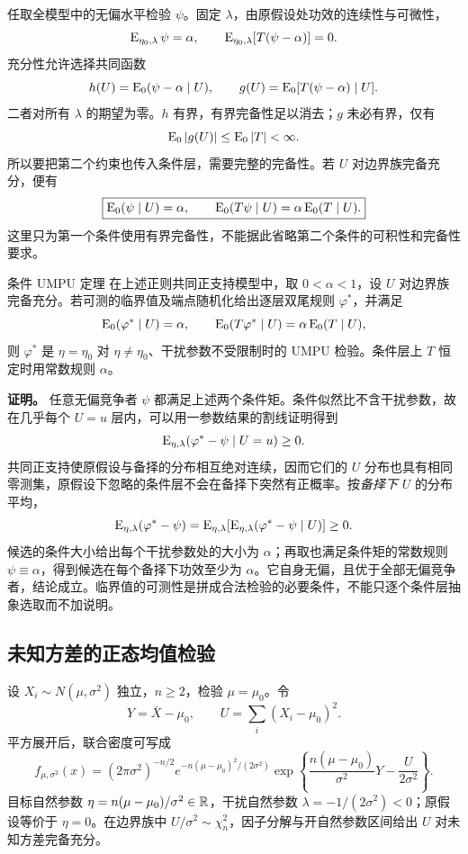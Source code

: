 任取全模型中的无偏水平检验 $\psi$。固定 $\lambda$，由原假设处功效的连续性与可微性，
\[
 \operatorname{E}_{\eta_0,\lambda}\psi=\alpha,\qquad
 \operatorname{E}_{\eta_0,\lambda}[T(\psi-\alpha)]=0.
\]
充分性允许选择共同函数
\[
 h(U)=\operatorname{E}_0(\psi-\alpha\mid U),\qquad
 g(U)=\operatorname{E}_0[T(\psi-\alpha)\mid U].
\]
二者对所有 $\lambda$ 的期望为零。$h$ 有界，有界完备性足以消去；$g$ 未必有界，仅有
\[
 \operatorname{E}_0|g(U)|\le\operatorname{E}_0|T|<\infty.
\]
所以要把第二个约束也传入条件层，需要完整的完备性。若 $U$ 对边界族完备充分，便有
\[
 \boxed{\operatorname{E}_0(\psi\mid U)=\alpha,\qquad
 \operatorname{E}_0(T\psi\mid U)=\alpha\operatorname{E}_0(T\mid U).}
\]
这里只为第一个条件使用有界完备性，不能据此省略第二个条件的可积性和完备性要求。

\begin{definitionbox}{条件 UMPU 定理}
在上述正则共同正支持模型中，取 $0<\alpha<1$，设 $U$ 对边界族完备充分。若可测的临界值及端点随机化给出逐层双尾规则 $\varphi^*$，并满足
\[
 \operatorname{E}_0(\varphi^*\mid U)=\alpha,\qquad
 \operatorname{E}_0(T\varphi^*\mid U)=\alpha\operatorname{E}_0(T\mid U),
\]
则 $\varphi^*$ 是 $\eta=\eta_0$ 对 $\eta\ne\eta_0$、干扰参数不受限制时的 UMPU 检验。条件层上 $T$ 恒定时用常数规则 $\alpha$。
\end{definitionbox}

\textbf{证明。}
任意无偏竞争者 $\psi$ 都满足上述两个条件矩。条件似然比不含干扰参数，故在几乎每个 $U=u$ 层内，可以用一参数结果的割线证明得到
\[
 \operatorname{E}_{\eta,\lambda}(\varphi^*-\psi\mid U=u)\ge0.
\]
共同正支持使原假设与备择的分布相互绝对连续，因而它们的 $U$ 分布也具有相同零测集，原假设下忽略的条件层不会在备择下突然有正概率。按\emph{备择下} $U$ 的分布平均，
\[
 \operatorname{E}_{\eta,\lambda}(\varphi^*-\psi)
 =\operatorname{E}_{\eta,\lambda}
       [\operatorname{E}_{\eta,\lambda}(\varphi^*-\psi\mid U)]\ge0.
\]
候选的条件大小给出每个干扰参数处的大小为 $\alpha$；再取也满足条件矩的常数规则 $\psi\equiv\alpha$，得到候选在每个备择下功效至少为 $\alpha$。它自身无偏，且优于全部无偏竞争者，结论成立。临界值的可测性是拼成合法检验的必要条件，不能只逐个条件层抽象选取而不加说明。

\subsection{未知方差的正态均值检验}

设 $X_i\sim N(\mu,\sigma^2)$ 独立，$n\ge2$，检验 $\mu=\mu_0$。令
\[
 Y=\bar X-\mu_0,\qquad U=\sum_i(X_i-\mu_0)^2.
\]
平方展开后，联合密度可写成
\[
 f_{\mu,\sigma^2}(x)=
 (2\pi\sigma^2)^{-n/2}e^{-n(\mu-\mu_0)^2/(2\sigma^2)}
 \exp\left\{\frac{n(\mu-\mu_0)}{\sigma^2}Y
                         -\frac{U}{2\sigma^2}\right\}.
\]
目标自然参数 $\eta=n(\mu-\mu_0)/\sigma^2\in\mathbb R$，干扰自然参数 $\lambda=-1/(2\sigma^2)<0$；原假设等价于 $\eta=0$。在边界族中 $U/\sigma^2\sim\chi_n^2$，因子分解与开自然参数区间给出 $U$ 对未知方差完备充分。

